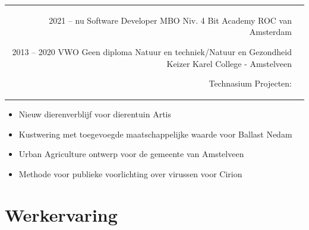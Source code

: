 \documentclass[
	11pt, %
]{FreemanCV}
\begin{document}
\begin{paracol}{2}




	\begin{supertabular}{r l} %

		\qualificationentry
		{2021 -- nu} %
		{Software Developer MBO Niv. 4} %
		{} %
		{Bit Academy} %
		{ROC van Amsterdam} %

		\qualificationentry
		{2013 -- 2020} %
		{VWO} %
		{Geen diploma} %
		{Natuur en techniek/Natuur en Gezondheid} %
		{Keizer Karel College - Amstelveen} %

		\qualificationentry
		{ } %
		{Technasium Projecten:} %
		{} %
		{ } %
		{ } %
	\end{supertabular}

		\vspace{-28pt}
		\small 
		\begin{itemize}
			\item Nieuw dierenverblijf voor dierentuin Artis
			\item Kustwering met toegevoegde maatschappelijke waarde voor Ballast Nedam
			\item Urban Agriculture ontwerp voor de gemeente van Amstelveen
			\item Methode voor publieke voorlichting over virussen voor Cirion
		\end{itemize}
		\normalsize

	\section{Werkervaring}


\end{paracol}
\end{document}

